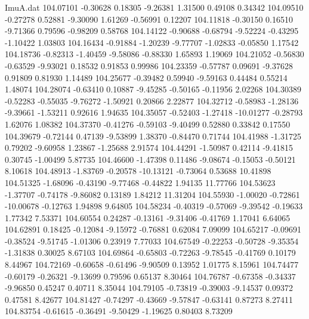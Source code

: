 \begin{filecontents}{ImuA.dat}
 104.07101   -0.30628    0.18305   -9.26381    1.31500    0.49108    0.34342
 104.09510   -0.27278    0.52881   -9.30090    1.61269   -0.56991    0.12207
 104.11818   -0.30150    0.16510   -9.71366    0.79596   -0.98209    0.58768
 104.14122   -0.90688   -0.68794   -9.52224   -0.43295   -1.10422    1.03803
 104.16434   -0.91884   -1.20239   -9.77707   -1.02833   -0.05850    1.17542
 104.18736   -0.82313   -1.40459   -9.58086   -0.88330    1.65893    1.19069
 104.21052   -0.56830   -0.63529   -9.93021    0.18532    0.91853    0.99986
 104.23359   -0.57787    0.09691   -9.37628    0.91809    0.81930    1.14489
 104.25677   -0.39482    0.59940   -9.59163    0.44484    0.55214    1.48074
 104.28074   -0.63410    0.10887   -9.45285   -0.50165   -0.11956    2.02268
 104.30389   -0.52283   -0.55035   -9.76272   -1.50921    0.20866    2.22877
 104.32712   -0.58983   -1.28136   -9.39661   -1.53211    0.92616    1.94635
 104.35057   -0.52403   -1.27418  -10.01277   -0.28793    1.62076    1.08382
 104.37370   -0.41276   -0.59103   -9.40499    0.52880    0.33842    0.17550
 104.39679   -0.72144    0.47139   -9.53899    1.38370   -0.84470    0.71744
 104.41988   -1.31725    0.79202   -9.60958    1.23867   -1.25688    2.91574
 104.44291   -1.50987    0.42114   -9.41815    0.30745   -1.00499    5.87735
 104.46600   -1.47398    0.11486   -9.08674   -0.15053   -0.50121    8.10618
 104.48913   -1.83769   -0.20578  -10.13121   -0.73064    0.53688   10.41898
 104.51325   -1.68096   -0.43190   -9.77468   -0.44822    1.94135   11.77766
 104.53623   -1.37707   -0.74178   -9.86082    0.13189    1.84212   11.31204
 104.55930   -1.00020   -0.72861  -10.00678   -0.12763    1.94898    9.64805
 104.58234   -0.40319   -0.57069   -9.39542   -0.19633    1.77342    7.53371
 104.60554    0.24287   -0.13161   -9.31406   -0.41769    1.17041    6.64065
 104.62891    0.18425   -0.12084   -9.15972   -0.76881    0.62084    7.09099
 104.65217   -0.09691   -0.38524   -9.51745   -1.01306    0.23919    7.77033
 104.67549   -0.22253   -0.50728   -9.35354   -1.31838    0.30025    8.67103
 104.69864   -0.65803   -0.72263   -9.78545   -0.41769    0.10179    8.44967
 104.72169   -0.60658   -0.61496   -9.90509    0.13952    1.01775    8.15961
 104.74477   -0.60179   -0.26321   -9.13699    0.79596    0.65137    8.30464
 104.76787   -0.67358   -0.34337   -9.96850    0.45247    0.40711    8.35044
 104.79105   -0.73819   -0.39003   -9.14537    0.09372    0.47581    8.42677
 104.81427   -0.74297   -0.43669   -9.57847   -0.63141    0.87273    8.27411
 104.83754   -0.61615   -0.36491   -9.50429   -1.19625    0.80403    8.73209

\end{filecontents}
